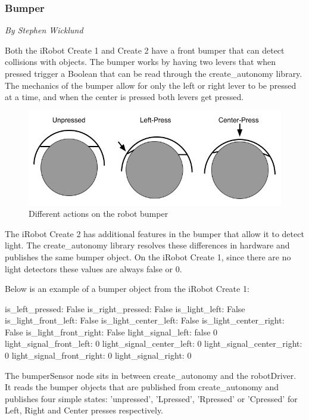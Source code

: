 \documentclass[12pt]{report}
\newcommand{\sectionAuthor}[1]{{\small\vspace{-1em}\textit{#1}}\bigskip\par}
\begin{document}
\subsubsection{Bumper}
\sectionAuthor{By Stephen Wicklund}
Both the iRobot Create 1 and Create 2 have a front bumper that can detect collisions with objects. The bumper works by having two levers that when pressed trigger a Boolean that can be read through the create\_autonomy library. The mechanics of the bumper allow for only the left or right lever to be pressed at a time, and when the center is pressed both levers get pressed.
\begin{figure}[H]
    \centering
    \includegraphics[scale=0.5]{images/Bumper Presses.png}
    \caption{Different actions on the robot bumper}
    \label{Robot Bumper Actions}
\end{figure}

The iRobot Create 2 has additional features in the bumper that allow it to detect light. The create\_autonomy library resolves these differences in hardware and publishes the same bumper object. On the iRobot Create 1, since there are no light detectors these values are always false or 0.  

Below is an example of a bumper object from the iRobot Create 1:
\begin{python}
is_left_pressed: False
is_right_pressed: False
is_light_left: False
is_light_front_left: False
is_light_center_left: False
is_light_center_right: False
is_light_front_right: False
light_signal_left: false 0
light_signal_front_left: 0
light_signal_center_left: 0
light_signal_center_right: 0
light_signal_front_right: 0
light_signal_right: 0
\end{python}

The bumperSensor node sits in between create\_autonomy and the robotDriver. It reads the bumper objects that are published from create\_autonomy and publishes four simple states: 'unpressed', 'Lpressed', 'Rpressed' or 'Cpressed' for Left, Right and Center presses respectively.
\end{document}
